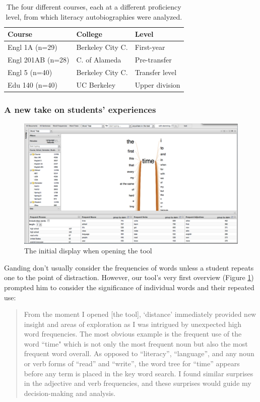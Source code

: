 \documentclass{sig-alternate}
\begin{document}
\begin{table}
\begin{tabular}{lll}
Course& College & Level \\
\hline
Engl 1A (n=29) & Berkeley City C.& First-year \\
Engl 201AB (n=28) & C. of Alameda & Pre-transfer \\
Engl 5 (n=40) & Berkeley City C. & Transfer level \\
Edu 140 (n=40) & UC Berkeley & Upper division \\
\end{tabular}
\caption{The four different courses, each at a different proficiency level, from which literacy autobiographies were analyzed. \label{table:rex-courses}}
\end{table}


 \subsubsection{A new take on students' experiences}

\begin{figure}
\includegraphics[width=\textwidth]{fig/rex/01.png}
\caption{The initial display when opening the tool \label{fig:rex01}}
\end{figure}

Ganding don't usually consider the frequencies of words unless a student repeats one to the point of distraction. However, our tool's very first overview (Figure \ref{fig:rex01}) prompted him to consider the significance of individual words and their repeated use:
\begin{quote}
From the moment I opened [the tool], `distance' immediately provided new insight and areas of exploration as I was intrigued by unexpected high word frequencies.  The most obvious example is the frequent use of the word ``time" which is not only the most frequent noun but also the most frequent word overall.  As opposed to ``literacy'', ``language'', and any noun or verb forms of ``read'' and ``write'', the word tree for ``time'' appears before any term is placed in the key word search.   I found similar surprises in the adjective and verb frequencies, and these surprises would guide my decision-making and analysis.
\end{quote}
\end{document}
